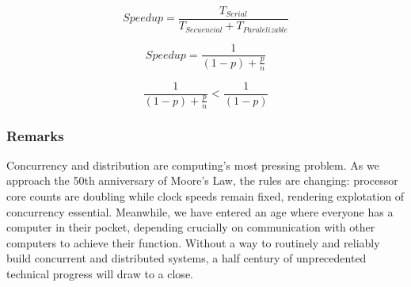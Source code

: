 \documentclass[hyperref={pdfpagelabels=false}]{beamer}
\begin{document}
\begin{frame}
$$ Speedup =  \frac{T_{Serial}}{T_{Secuencial} + T_{Paralelizable} } $$
\end{frame}

\begin{frame}
$$ Speedup =  \frac{1}{ (1-p) + \frac{p}{n} } $$
\end{frame}

\begin{frame}
$$  \frac{1}{ (1-p) + \frac{p}{n} } <  \frac{1}{ (1-p) } $$
\end{frame}


\begin{frame}
\frametitle{Remarks}

Concurrency and distribution are computing's most pressing problem. As we approach the 50th anniversary of Moore's Law, the rules are changing: processor core counts are doubling while clock speeds remain fixed, rendering explotation of concurrency essential. Meanwhile, we have entered an age where everyone has a computer in their pocket, depending crucially on communication with other computers to achieve their function. Without a way to routinely and reliably build concurrent and distributed systems, a half century of unprecedented technical progress will draw to a close.


\end{frame}
\end{document}
